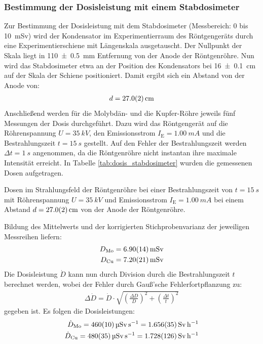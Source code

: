 \documentclass[11pt, a4paper]{article}
\numberwithin{equation}{section}
\begin{document}
\subsubsection{Bestimmung der Dosisleistung mit einem Stabdosimeter}
Zur Bestimmung der Dosisleistung mit dem Stabdosimeter (Messbereich: \num{0} bis \SI{10}{mSv}) wird der Kondensator im Experimentierraum des Röntgengeräts durch eine Experimentierschiene mit Längenskala ausgetauscht.
Der Nullpunkt der Skala liegt in \SI{110 +- 0.5}{mm} Entfernung von der Anode der Röntgenröhre.
Nun wird das Stabdosimeter etwa an der Position des Kondensators bei \SI{16 +- 0.1}{cm} auf der Skala der Schiene positioniert.
Damit ergibt sich ein Abstand von der Anode von:
\begin{align*}
	d = \SI{27.0 +- 0.2}{cm}
\end{align*}
Anschließend werden für die Molybdän- und die Kupfer-Röhre jeweils fünf Messungen der Dosis durchgeführt.
Dazu wird das Röntgengerät auf die Röhrenspannung $U = \SI{35}{kV}$, den Emissionsstrom $I_\mathrm{E} = \SI{1.00}{mA}$ und die Bestrahlungszeit $t = \SI{15}{s}$ gestellt.
Auf den Fehler der Bestrahlungszeit werden $\Delta t = \SI{1}{s}$ angenommen, da die Röntgenröhre nicht instantan ihre maximale Intensität erreicht.
In Tabelle \ref{tab:dosis_stabdosimeter} wurden die gemessenen Dosen aufgetragen.
\begin{table}[ht]
	\centering
	
	\caption{Dosen im Strahlungsfeld der Röntgenröhre bei einer Bestrahlungszeit von $t=\SI{15}{s}$ mit Röhrenspannung $U=\SI{35}{kV}$ und Emissionsstrom $I_\mathrm{E} = \SI{1.00}{mA}$ bei einem Abstand $d=\SI{27 +- 0.2}{cm}$ von der Anode der Röntgenröhre.}
	\label{tab:dosis_stabdosimeter}
\end{table}
Bildung des Mittelwerts und der korrigierten Stichprobenvarianz der jeweiligen Messreihen liefern:
\begin{align*}
	D_\mathrm{Mo} = \SI{6.90 +- 0.14}{mSv} \\
	D_\mathrm{Cu} = \SI{7.20 +- 0.21}{mSv}
\end{align*}
Die Dosisleistung $\dot{D}$ kann nun durch Division durch die Bestrahlungszeit $t$ berechnet werden, wobei der Fehler durch Gauß'sche Fehlerfortpflanzung zu:
\begin{align}
	\Delta \dot{D} = \dot{D} \cdot \sqrt{\left( \frac{\Delta D}{D} \right)^2 + \left( \frac{\Delta t}{t} \right)^2}
\end{align}
gegeben ist.
Es folgen die Dosisleistungen:
\begin{align*}
	\dot{D}_\mathrm{Mo} = \SI{460 +- 10}{\micro\sievert\per\second} = \SI{1.656 +- 0.035}{\sievert\per\hour}\\
	\dot{D}_\mathrm{Cu} = \SI{480 +- 35}{\micro\sievert\per\second} = \SI{1.728 +- 0.126}{\sievert\per\hour}
\end{align*}
\end{document}
